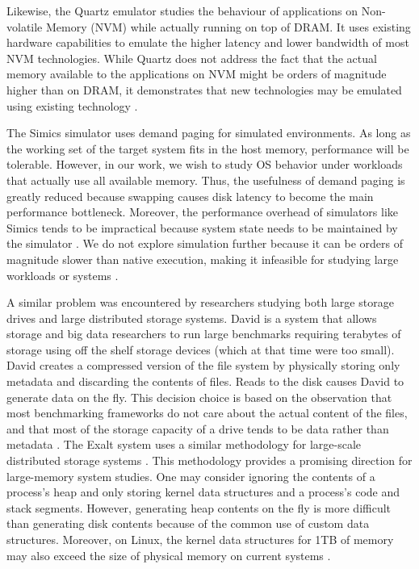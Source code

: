 \documentclass[twocolumn,11pt]{article}
\begin{document}
Likewise, the Quartz emulator studies the behaviour of applications on
Non-volatile Memory (NVM) while actually running on top of DRAM. It uses
existing hardware capabilities to emulate the higher latency and lower bandwidth
of most NVM technologies. While Quartz does not address the fact that the actual
memory available to the applications on NVM might be orders of magnitude higher
than on DRAM, it demonstrates that new technologies may be emulated using
existing technology \cite{quartz}.


The Simics simulator uses demand paging for simulated environments.
As long as the working set of
the target system fits in the host memory, performance will be tolerable.
However, in our work, we wish to study OS behavior under workloads that
actually use all available memory. Thus, the usefulness of demand paging is
greatly reduced because swapping causes disk latency to become the main
performance bottleneck. Moreover, the performance overhead of simulators like
Simics tends to be impractical because system state needs to be maintained by
the simulator \cite{simics}. We do not explore simulation further because it
can be orders of magnitude slower than native execution, making it infeasible
for studying large workloads or systems \cite{2kmachine}.

A similar problem was encountered by researchers studying both large storage
drives and large distributed storage systems. David is a system that allows
storage and big data researchers to run large benchmarks requiring terabytes of
storage using off the shelf storage devices (which at that time were too small).
David creates a compressed version of the file system by physically storing only
metadata and discarding the contents of files. Reads to the disk causes David to
generate data on the fly. This decision choice is based on the observation that
most benchmarking frameworks do not care about the actual content of the files,
and that most of the storage capacity of a drive tends to be data rather than
metadata \cite{david}. The Exalt system uses a similar methodology for
large-scale distributed storage systems \cite{exalt}. This methodology provides
a promising direction for large-memory system studies. One may consider ignoring
the contents of a process’s heap and only storing kernel data structures and a
process’s code and stack segments. However, generating heap contents on the fly
is more difficult than generating disk contents because of the common use of
custom data structures. Moreover, on Linux, the kernel data structures for 1TB
of memory may also exceed the size of physical memory on current systems
\cite{simics}.
\end{document}

